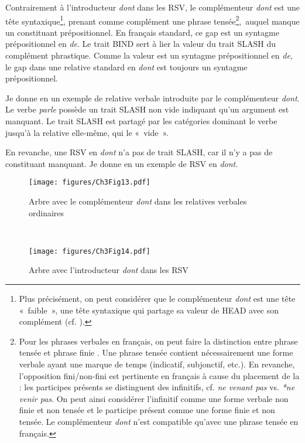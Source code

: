 Contrairement à l’introducteur \textit{dont} dans les RSV, le complémenteur \textit{dont} est une tête syntaxique\footnote{Plus précisément, on peut considérer que le complémenteur \textit{dont} est une tête «~faible~», {\cad} une tête syntaxique qui partage sa valeur de HEAD avec son complément (cf. \citealt{Tseng2002}).}, prenant comme complément une phrase tensée\footnote{ Pour les phrases verbales en français, on peut faire la distinction entre phrase tensée et phrase finie \citep{GGFToAppear}. Une phrase tensée contient nécessairement une forme verbale ayant une marque de temps (indicatif, subjonctif, etc.). En revanche, l’opposition fini/non-fini est pertinente en français à cause du placement de la  : les participes présents se distinguent des infinitifs, cf. \textit{ne venant pas} vs. \textit{*ne venir pas}. On peut ainsi considérer l’infinitif comme une forme verbale non finie et non tensée et le participe présent comme une forme finie et non tensée. Le complémenteur \textit{dont} n’est compatible qu’avec une phrase tensée en français.},~auquel manque un constituant prépositionnel. En français standard, ce gap est un syntagme prépositionnel en \textit{de}. Le trait BIND sert à lier la valeur du trait SLASH du complément phrastique. Comme la valeur est un syntagme prépositionnel en \textit{de}, le gap dans une relative standard en \textit{dont} est toujours un syntagme prépositionnel.

Je donne en  un exemple de relative verbale introduite par le complémenteur \textit{dont}. Le verbe \textit{parle} possède un trait SLASH non vide indiquant qu’un argument est manquant. Le trait SLASH est partagé par les catégories dominant le verbe jusqu’à la relative elle-même, qui le «~vide~». 


En revanche, une RSV en \textit{dont} n’a pas de trait SLASH, car il n’y a pas de constituant manquant. Je donne en  un exemple de RSV en \textit{dont}. 

\newpage  
\begin{figure}
\texttt{[image: figures/Ch3Fig13.pdf]}  
\caption{Arbre avec le complémenteur \textit{dont} dans les relatives verbales ordinaires}
\label{ch3:fig13}
\end{figure}

~
\begin{figure}
\texttt{[image: figures/Ch3Fig14.pdf]}  
\caption{Arbre avec l’introducteur \textit{dont} dans les RSV}
\label{ch3:fig14}
\end{figure}

